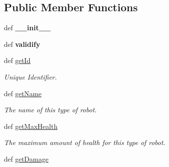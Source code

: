 \subsection*{Public Member Functions}
\begin{DoxyCompactItemize}
\item 
\hypertarget{classGameObject_1_1Type_a62ae914c3017b69716212e83af59b02d}{
def {\bfseries \_\-\_\-init\_\-\_\-}}
\label{classGameObject_1_1Type_a62ae914c3017b69716212e83af59b02d}

\item 
\hypertarget{classGameObject_1_1Type_a7d8d0f7426d7df79fcc1e381b3686541}{
def {\bfseries validify}}
\label{classGameObject_1_1Type_a7d8d0f7426d7df79fcc1e381b3686541}

\item 
\hypertarget{classGameObject_1_1Type_ac1e4a727810e33a69eb691e5d06d23b2}{
def \hyperlink{classGameObject_1_1Type_ac1e4a727810e33a69eb691e5d06d23b2}{getId}}
\label{classGameObject_1_1Type_ac1e4a727810e33a69eb691e5d06d23b2}

\begin{DoxyCompactList}\small\item\em Unique Identifier. \item\end{DoxyCompactList}\item 
\hypertarget{classGameObject_1_1Type_a0130ebca6b9bcc12603ddc62d6d559d8}{
def \hyperlink{classGameObject_1_1Type_a0130ebca6b9bcc12603ddc62d6d559d8}{getName}}
\label{classGameObject_1_1Type_a0130ebca6b9bcc12603ddc62d6d559d8}

\begin{DoxyCompactList}\small\item\em The name of this type of robot. \item\end{DoxyCompactList}\item 
\hypertarget{classGameObject_1_1Type_a4609fc18dbf135b12ad9c92ff388bb17}{
def \hyperlink{classGameObject_1_1Type_a4609fc18dbf135b12ad9c92ff388bb17}{getMaxHealth}}
\label{classGameObject_1_1Type_a4609fc18dbf135b12ad9c92ff388bb17}

\begin{DoxyCompactList}\small\item\em The maximum amount of health for this type of robot. \item\end{DoxyCompactList}\item 
\hypertarget{classGameObject_1_1Type_a25e293b331ac205d8ded863f87b77afa}{
def \hyperlink{classGameObject_1_1Type_a25e293b331ac205d8ded863f87b77afa}{getDamage}}
\label{classGameObject_1_1Type_a25e293b331ac205d8ded863f87b77afa}


\end{DoxyCompactItemize}
